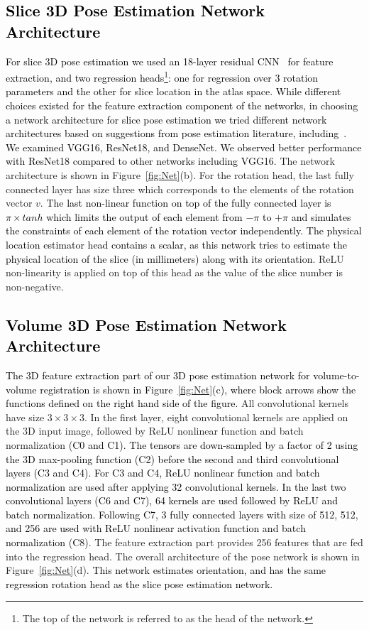 \documentclass[journal,transmag]{IEEEtran}
\begin{document}
\subsection{\textcolor{black}{Slice 3D Pose Estimation Network Architecture}}
\textcolor{black}{For slice 3D pose estimation we used an 18-layer residual CNN~\cite{he2016identity} for feature extraction, and \textcolor{black}{two regression heads\footnote{The top of the network is referred to as the head of the network.}}: one for regression over 3 rotation parameters and the other for slice location in the atlas space. }\textcolor{black}{While different choices existed for the feature extraction component of the networks, in choosing a network architecture for slice pose estimation we tried different network architectures based on suggestions from pose estimation literature, including~\cite{hou20183d}. We examined VGG16, ResNet18, and DenseNet. We observed better performance with ResNet18 compared to other networks including VGG16.} The network architecture is shown in Figure~\ref{fig:Net}(b). For the rotation head, the last fully connected layer has size three which corresponds to the elements of the rotation vector $v$. \textcolor{black}{The last non-linear function on top of the fully connected layer is $\pi \times tanh$ which limits the output of each element from $-\pi$ to $+\pi$ and simulates the constraints of each element of the rotation vector independently.} \textcolor{black}{The physical location estimator head contains a scalar, as this network tries to estimate the physical location of the slice (in millimeters) along with its orientation.} ReLU non-linearity is applied on top of this head as the value of the slice number is non-negative.

\subsection{\textcolor{black}{Volume 3D Pose Estimation Network Architecture}}
\textcolor{black}{
The 3D feature extraction part of our 3D pose estimation network for volume-to-volume registration is shown in Figure~\ref{fig:Net}(c), where block arrows show the functions defined on the right hand side of the figure.} All convolutional kernels have size $3 \times 3 \times 3$. In the first layer, eight convolutional kernels are applied on the 3D input image, followed by ReLU nonlinear function and batch normalization \textcolor{black}{(C0 and C1). The tensors are down-sampled by a factor \textcolor{black}{of} 2 using the 3D max-pooling function (C2) before the second and third convolutional layers (C3 and C4). For C3 and C4, ReLU nonlinear function and batch normalization are used after applying 32 convolutional kernels. In the last two convolutional layers (C6 and C7), 64 kernels are used followed by ReLU and batch normalization. Following C7, 3 fully connected layers with size of 512, 512, and 256 are used with ReLU nonlinear \textcolor{black}{activation} function and batch normalization (C8)}. The feature extraction part provides 256 features that are fed into the regression head. The overall architecture of the pose network is shown in Figure~\ref{fig:Net}(d). \textcolor{black}{This network estimates orientation, and has the same regression rotation head as the slice pose estimation network.}
\end{document}
